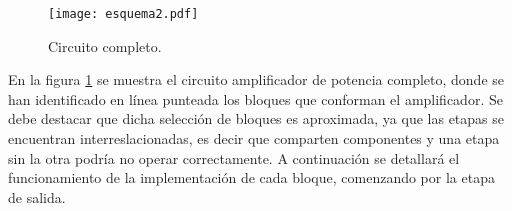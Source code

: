 \begin{figure}
	\centering
	\texttt{[image: esquema2.pdf]}
	\caption{Circuito completo.}
	\label{fig.cto_completo}
	\end{figure}

En la figura \ref{fig.cto_completo} se muestra el circuito amplificador de potencia completo, donde se han identificado en línea punteada los bloques que conforman el amplificador. Se debe destacar que dicha selección de bloques es aproximada, ya que las etapas se encuentran interreslacionadas, es decir que comparten componentes y una etapa sin la otra podría no operar correctamente. A continuación se detallará el funcionamiento de la implementación de cada bloque, comenzando por la etapa de salida.
